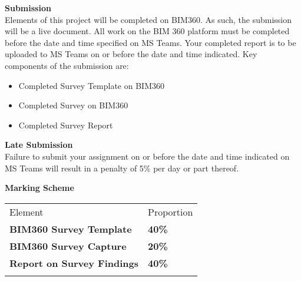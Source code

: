 \newpage


\textbf{Submission}\\
Elements of this project will be completed on BIM360. As such, the submission will be a live document.  All work on the BIM 360 platform must be completed before the date and time specified on MS Teams.  Your completed report is to be uploaded to MS Teams on or before the date and time indicated.  Key components of the submission are:
\begin{itemize}
	\item Completed Survey Template on BIM360
	\item Completed Survey on BIM360	
	\item Completed Survey Report
\end{itemize}




\textbf{Late Submission}\\
Failure to submit your assignment on or before the date and time indicated on MS Teams will result in a penalty of 5\% per day or part thereof.

\vspace{0.5cm}
\textbf{Marking Scheme}

\begin{table}[h!]
     \begin{center}
     \begin{tabular}{p{5cm}  p{5cm} }
     \toprule
      \textbf\large{Element} & \textbf\large{Proportion} \\ 
    \cmidrule(r){1-1}\cmidrule(lr){2-2}
      \textbf{BIM360 Survey Template} & \textbf{40\%}\\
      \textbf{BIM360 Survey Capture} & \textbf{20\%}\\
      \textbf{Report on Survey Findings} & \textbf{40\%}\\
      \\ \bottomrule
      \end{tabular}
      \label{tbl:markSchemeAsmt3}
      \end{center}
 \end{table}


